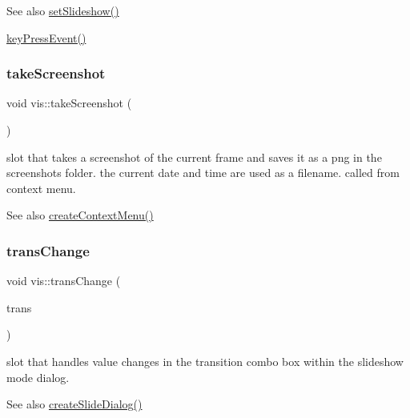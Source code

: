 \begin{DoxySeeAlso}{See also}
\mbox{\hyperlink{classvis_ae8441d597e876882029ee13b16aa4cc2}{set\+Slideshow()}} 

\mbox{\hyperlink{classvis_a067c6621db4af8a2b34fe00a349b44db}{key\+Press\+Event()}} 
\end{DoxySeeAlso}
\mbox{\label{classvis_aa44c7eaf89bd4bc5dbcd75d4e2458ec7}} 
\subsubsection{\texorpdfstring{take\+Screenshot}{takeScreenshot}}
{\footnotesize\ttfamily void vis\+::take\+Screenshot (\begin{DoxyParamCaption}{ }\end{DoxyParamCaption})\hspace{0.3cm}{\ttfamily [slot]}}

slot that takes a screenshot of the current frame and saves it as a png in the screenshots folder. the current date and time are used as a filename. called from context menu.

\begin{DoxySeeAlso}{See also}
\mbox{\hyperlink{classvis_a63af66f730f0f06f36d255bcc7a7a244}{create\+Context\+Menu()}} 
\end{DoxySeeAlso}
\mbox{\label{classvis_a01552b5b750d2c56980b62dc1bc3dac9}} 
\subsubsection{\texorpdfstring{trans\+Change}{transChange}}
{\footnotesize\ttfamily void vis\+::trans\+Change (\begin{DoxyParamCaption}\item[{Q\+String}]{trans }\end{DoxyParamCaption})\hspace{0.3cm}{\ttfamily [slot]}}

slot that handles value changes in the transition combo box within the slideshow mode dialog.

\begin{DoxySeeAlso}{See also}
\mbox{\hyperlink{classvis_a09be90ab62dec1dcf2a72690d254acfb}{create\+Slide\+Dialog()}} 
\end{DoxySeeAlso}


